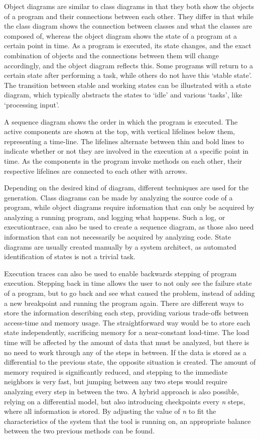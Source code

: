 Object diagrams are similar to class diagrams in that they both show the objects of a program and their connections between each other.
They differ in that while the class diagram shows the connection between classes and what the classes are composed of, whereas the object diagram shows the state of a program at a certain point in time.
As a program is executed, its state changes, and the exact combination of objects and the connections between them will change accordingly, and the object diagram reflects this.
Some programs will return to a certain state after performing a task, while others do not have this `stable state'.
The transition between stable and working states can be illustrated with a state diagram, which typically abstracts the states to `idle' and various `tasks', like `processing input'.

A sequence diagram shows the order in which the program is executed.
The active components are shown at the top, with vertical \glspl{lifeline} below them, representing a time-line.
The lifelines alternate between thin and bold lines to indicate whether or not they are involved in the execution at a specific point in time.
As the components in the program invoke methods on each other, their respective lifelines are connected to each other with arrows.

Depending on the desired kind of diagram, different techniques are used for the generation.
Class diagrams can be made by analyzing the source code of a program, while object diagrams require information that can only be acquired by analyzing a running program, and logging what happens.
Such a log, or \gls{executiontrace}, can also be used to create a sequence diagram, as those also need information that can not necessarily be acquired by analyzing code.
State diagrams are usually created manually by a system architect, as automated identification of states is not a trivial task.

Execution traces can also be used to enable backwards stepping of program execution.
Stepping back in time allows the user to not only see the failure state of a program, but to go back and see what caused the problem, instead of adding a new \gls{breakpoint} and running the program again.
There are different ways to store the information describing each step, providing various trade-offs between access-time and memory usage.
The straightforward way would be to store each state independently, sacrificing memory for a near-constant load-time.
The load time will be affected by the amount of data that must be analyzed, but there is no need to work through any of the steps in between.
If the data is stored as a differential to the previous state, the opposite situation is created.
The amount of memory required is significantly reduced, and stepping to the immediate neighbors is very fast, but jumping between any two steps would require analyzing every step in between the two.
A hybrid approach is also possible, relying on a differential model, but also introducing checkpoints every \textit{n} steps, where all information is stored.
By adjusting the value of \textit{n} to fit the characteristics of the system that the tool is running on, an appropriate balance between the two previous methods can be found.


